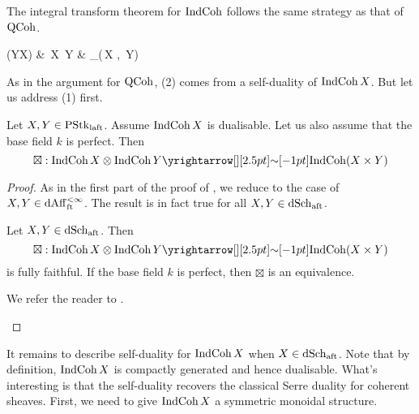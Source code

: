 \documentclass[./main.tex]{subfiles}
\begin{document}
  
The integral transform theorem for $\mathrm{IndCoh}$ follows the same strategy
as that of $\mathrm{QCoh}$.
\begin{cd}
  {\INDCOH(Y\times X)} & {\INDCOH\,X \otimes \INDCOH\,Y} 
  & {\DGCAT_\CTS(\INDCOH\,X , \INDCOH\,Y)}
	\arrow["\sim"',"{(1)}", from=1-2, to=1-1]
	\arrow["\sim","{(2)}"', from=1-2, to=1-3]
\end{cd}
As in the argument for $\mathrm{QCoh}$, 
(2) comes from a self-duality of $\mathrm{IndCoh}\,X$.
But let us address (1) first.

\begin{prop}

  Let $X, Y \in \mathrm{PStk}_{\mathrm{laft}}$.
  Assume $\mathrm{IndCoh}\,X$ is dualisable.
  Let us also assume that the base field $k$ is perfect.
  Then \[
    \boxtimes : \INDCOH\,X \otimes \INDCOH\,Y \map{\sim}{}
    \INDCOH(X \times Y)
  \]
\end{prop}
\begin{proof}

  As in the first part of the proof of
  ,
  we reduce to the case of $X, Y \in \mathrm{dAff}^{<\infty}_{\mathrm{ft}}$.
  The result is in fact true for all $X, Y \in \mathrm{dSch}_{\mathrm{aft}}$.

  \begin{lem}[]

    Let $X , Y \in \mathrm{dSch}_{\mathrm{aft}}$.
    Then \[
      \boxtimes : \INDCOH\,X \otimes \INDCOH\,Y \map{\sim}{}
      \INDCOH(X \times Y)
    \] 
    is fully faithful.
    If the base field $k$ is perfect,
    then $\boxtimes$ is an equivalence. 

    \begin{proof1}
      We refer the reader to \cite[Ch 4 , 6.3.4]{GR1}.
    \end{proof1}
  \end{lem}
\end{proof}

It remains to describe self-duality for $\mathrm{IndCoh}\,X$ when $X \in \mathrm{dSch}_{\mathrm{aft}}$.
Note that by definition, 
$\mathrm{IndCoh}\,X$ is compactly generated and hence dualisable.
What's interesting is that the self-duality recovers 
the classical Serre duality for coherent sheaves.
First, we need to give $\mathrm{IndCoh}\,X$ a symmetric monoidal structure.
\end{document}
